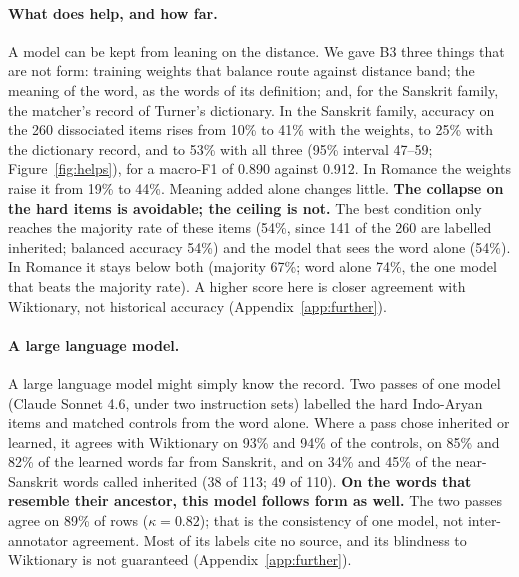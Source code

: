 \documentclass[11pt]{article}
\begin{document}
\paragraph{What does help, and how far.} A model can be kept from leaning on the distance. We gave B3 three things that are not form: training weights that balance route against distance band; the meaning of the word, as the words of its definition; and, for the Sanskrit family, the matcher's record of Turner's dictionary. In the Sanskrit family, accuracy on the 260 dissociated items rises from 10\% to 41\% with the weights, to 25\% with the dictionary record, and to 53\% with all three (95\% interval 47--59; Figure~\ref{fig:helps}), for a macro-F1 of 0.890 against 0.912. In Romance the weights raise it from 19\% to 44\%. Meaning added alone changes little. \textbf{The collapse on the hard items is avoidable; the ceiling is not.} The best condition only reaches the majority rate of these items (54\%, since 141 of the 260 are labelled inherited; balanced accuracy 54\%) and the model that sees the word alone (54\%). In Romance it stays below both (majority 67\%; word alone 74\%, the one model that beats the majority rate). A higher score here is closer agreement with Wiktionary, not historical accuracy (Appendix~\ref{app:further}).

\paragraph{A large language model.} A large language model might simply know the record. Two passes of one model (Claude Sonnet 4.6, under two instruction sets) labelled the hard Indo-Aryan items and matched controls from the word alone. Where a pass chose inherited or learned, it agrees with Wiktionary on 93\% and 94\% of the controls, on 85\% and 82\% of the learned words far from Sanskrit, and on 34\% and 45\% of the near-Sanskrit words called inherited (38 of 113; 49 of 110). \textbf{On the words that resemble their ancestor, this model follows form as well.} The two passes agree on 89\% of rows ($\kappa=0.82$); that is the consistency of one model, not inter-annotator agreement. Most of its labels cite no source, and its blindness to Wiktionary is not guaranteed (Appendix~\ref{app:further}).
\end{document}
